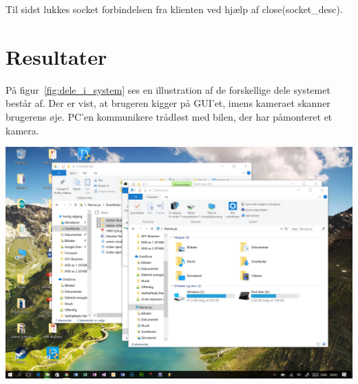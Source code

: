 \documentclass[12pt,fleqn,a4paper]{report}
\begin{document}
Til sidst lukkes socket forbindelsen fra klienten ved hjælp af close(socket_desc).

\newpage

\chapter{Resultater}

På figur~\ref{fig:dele_i_system} ses en illustration af de forskellige dele systemet består af. Der er vist, at brugeren kigger på GUI’et, imens kameraet skanner brugerens øje. PC’en kommunikere trådløst med bilen, der har påmonteret et kamera.

\begin{center}
	\includegraphics[width=0.9 \textwidth]{hej1.png}
	\label{fig:dele_i_system}
\end{center}

\newpage
\end{document}
